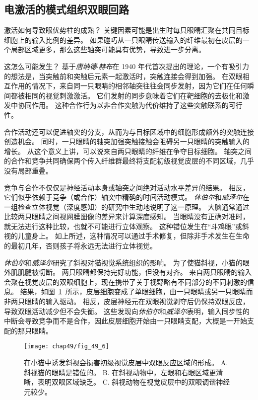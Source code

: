\subsection{电激活的模式组织双眼回路}

激活如何导致眼优势柱的成熟？
关键因素可能是出生时每只眼睛汇聚在共同目标细胞上的输入比例的差异。
如果碰巧从一只眼睛传送输入的纤维最初在皮层的一个局部区域更多，那么这些轴突可能具有优势，导致进一步分离。


这怎么可能发生？
基于\textit{唐纳德$\cdot$赫布}在 1940 年代首次提出的理论，一个有吸引力的想法是，当突触前和突触后元素一起激活时，突触连接会得到加强。
在双眼相互作用的情况下，来自同一只眼睛的相邻轴突往往会同步发射，因为它们在任何瞬间都被相同的视觉刺激激活。
它们发射的同步意味着它们在靶细胞的去极化和激发中协同作用。
这种合作行为以非合作突触为代价维持了这些突触联系的可行性。


合作活动还可以促进轴突的分支，从而为与目标区域中的细胞形成额外的突触连接创造机会。
同时，一只眼睛的轴突加强突触接触会阻碍另一只眼睛的突触输入的增长。
从这个意义上讲，可以说来自两只眼睛的纤维在争夺目标细胞。
轴突之间的合作和竞争共同确保两个传入纤维群最终将支配初级视觉皮层的不同区域，几乎没有局部重叠。


竞争与合作不仅仅是神经活动本身或轴突之间绝对活动水平差异的结果。
相反，它们似乎依赖于竞争（或合作）轴突中精确的时间活动模式。
\textit{休伯尔}和\textit{威泽尔}在一组检查立体视觉（深度感知）的研究中生动地说明了这一原理。
大脑通常通过比较两只眼睛之间视网膜图像的差异来计算深度感知。
当眼睛没有正确对准时，就无法进行这种比较，也就不可能进行立体观察。
这种错位发生在“斗鸡眼”或斜视的儿童身上。
如上所述，这种情况可以通过手术修复，但除非手术发生在生命的最初几年，否则孩子将永远无法进行立体视觉。


\textit{休伯尔}和\textit{威泽尔}研究了斜视对猫视觉系统组织的影响。
为了使猫斜视，小猫的眼外肌肌腱被切断。 两只眼睛都保持完好功能，但没有对齐。
来自两只眼睛的输入会聚在视觉皮层的双眼细胞上，现在携带了关于视野略有不同部分的不同刺激的信息。
结果，如图~\ref{fig:49_6}~所示，皮层细胞变成了单眼细胞，由一只眼睛或另一只眼睛而非两只眼睛的输入驱动。 
相反，皮层神经元在双眼视觉剥夺后仍保持双眼反应，导致双眼活动减少但不会失衡。
这些发现向\textit{休伯尔}和\textit{威泽尔}表明，输入同步性的中断会导致竞争而不是合作，因此皮层细胞开始由一只眼睛支配，大概是一开始支配的那只眼睛。


\begin{figure}[htbp]
	\centering
	\texttt{[image: chap49/fig\_49\_6]}
	\caption{在小猫中诱发斜视会损害初级视觉皮层中双眼反应区域的形成。
		A. 斜视猫的眼睛是错位的。
		B. 在斜视动物中，左眼和右眼区域更清晰，表明双眼区域缺乏。
		C. 斜视动物在视觉皮层中的双眼调谐神经元较少。}
	\label{fig:49_6}
\end{figure}


